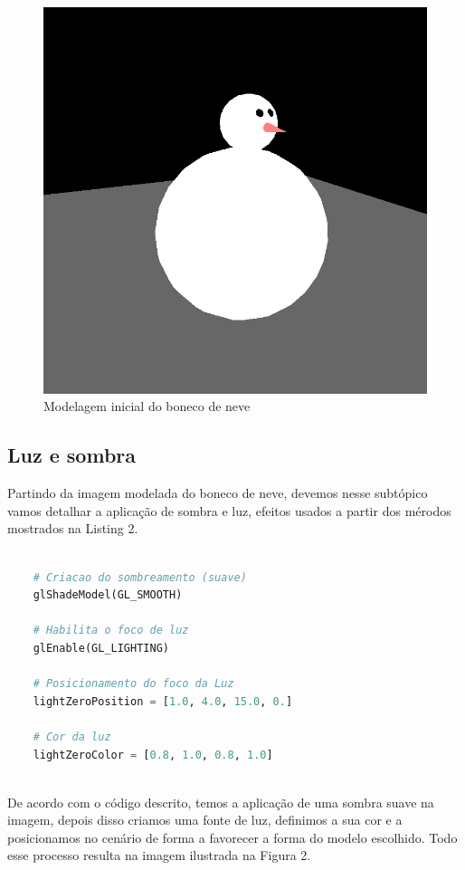 \documentclass[
	article,			%
	11pt,				%
	oneside,			%
	a4paper,			%
	english,			%
	brazil,				%
	sumario=tradicional
	]{abntex2}
\begin{document}
\begin{figure}[h]
	\centering\includegraphics[width=0.9\linewidth]{bonecob.png}
	\caption{Modelagem inicial do boneco de neve}
\end{figure}
	


\subsection{Luz e sombra}

Partindo da imagem modelada do boneco de neve, devemos nesse subtópico vamos detalhar 
a aplicação de sombra e luz, efeitos usados a partir dos mérodos mostrados na
Listing 2.

\begin{lstlisting}[language=Python, caption=Criação e posicionamento da luz]
   
	# Criacao do sombreamento (suave)
    glShadeModel(GL_SMOOTH)

	# Habilita o foco de luz
    glEnable(GL_LIGHTING)

    # Posicionamento do foco da Luz
    lightZeroPosition = [1.0, 4.0, 15.0, 0.]

    # Cor da luz
	lightZeroColor = [0.8, 1.0, 0.8, 1.0]
	
\end{lstlisting}

De acordo com o código descrito, temos a aplicação de uma sombra suave na imagem, depois disso
criamos uma fonte de luz, definimos a sua cor e a posicionamos no cenário de forma a favorecer a forma
do modelo escolhido. Todo esse processo resulta na imagem ilustrada na Figura 2.
\end{document}
